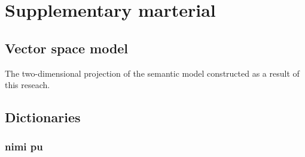 \documentclass[14pt, a4paper]{extreport}
\begin{document}
\printbibliography[heading=bibintoc, title={REFERENCES}, nottype=online]


\printbibliography[heading=bibintoc, title={ONLINE RESOURCES}, type=online]


\chapter{Supplementary marterial}

\section{Vector space model}

The two-dimensional projection of the semantic model constructed as a result of this reseach.


\section{Dictionaries}

\subsection{nimi pu}
\end{document}
